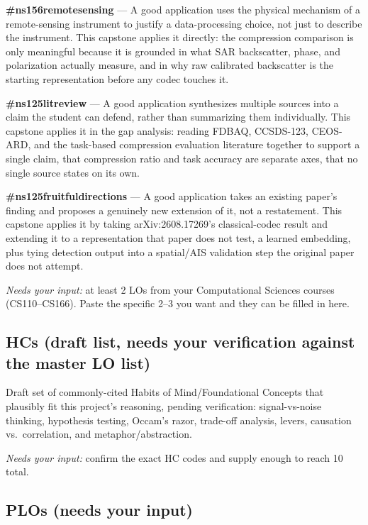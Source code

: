 \documentclass[11pt]{article}
\begin{document}
\textbf{\#ns156remotesensing} --- A good application uses the physical mechanism of a remote-sensing instrument to justify a data-processing choice, not just to describe the instrument. This capstone applies it directly: the compression comparison is only meaningful because it is grounded in what SAR backscatter, phase, and polarization actually measure, and in why raw calibrated backscatter is the starting representation before any codec touches it.

\textbf{\#ns125litreview} --- A good application synthesizes multiple sources into a claim the student can defend, rather than summarizing them individually. This capstone applies it in the gap analysis: reading FDBAQ, CCSDS-123, CEOS-ARD, and the task-based compression evaluation literature together to support a single claim, that compression ratio and task accuracy are separate axes, that no single source states on its own.

\textbf{\#ns125fruitfuldirections} --- A good application takes an existing paper's finding and proposes a genuinely new extension of it, not a restatement. This capstone applies it by taking arXiv:2608.17269's classical-codec result and extending it to a representation that paper does not test, a learned embedding, plus tying detection output into a spatial/AIS validation step the original paper does not attempt.

\textit{Needs your input:} at least 2 LOs from your Computational Sciences courses (CS110--CS166). Paste the specific 2--3 you want and they can be filled in here.

\subsection*{HCs (draft list, needs your verification against the master LO list)}

Draft set of commonly-cited Habits of Mind/Foundational Concepts that plausibly fit this project's reasoning, pending verification: signal-vs-noise thinking, hypothesis testing, Occam's razor, trade-off analysis, levers, causation vs.\ correlation, and metaphor/abstraction.

\textit{Needs your input:} confirm the exact HC codes and supply enough to reach 10 total.

\subsection*{PLOs (needs your input)}
\end{document}
